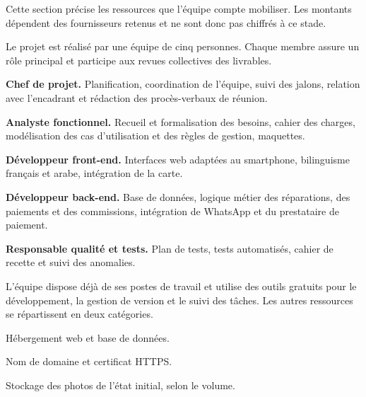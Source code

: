 

Cette section précise les ressources que l’équipe compte mobiliser. Les montants dépendent des fournisseurs retenus et ne sont donc pas chiffrés à ce stade.


Le projet est réalisé par une équipe de cinq personnes. Chaque membre assure un rôle principal et participe aux revues collectives des livrables.

\begin{cdcitems}
  \item \textbf{Chef de projet.} Planification, coordination de l’équipe, suivi des jalons, relation avec l’encadrant et rédaction des procès-verbaux de réunion.
  \item \textbf{Analyste fonctionnel.} Recueil et formalisation des besoins, cahier des charges, modélisation des cas d’utilisation et des règles de gestion, maquettes.
  \item \textbf{Développeur front-end.} Interfaces web adaptées au smartphone, bilinguisme français et arabe, intégration de la carte.
  \item \textbf{Développeur back-end.} Base de données, logique métier des réparations, des paiements et des commissions, intégration de WhatsApp et du prestataire de paiement.
  \item \textbf{Responsable qualité et tests.} Plan de tests, tests automatisés, cahier de recette et suivi des anomalies.
\end{cdcitems}


L’équipe dispose déjà de ses postes de travail et utilise des outils gratuits pour le développement, la gestion de version et le suivi des tâches. Les autres ressources se répartissent en deux catégories.


\begin{cdcitems}
  \item Hébergement web et base de données.
  \item Nom de domaine et certificat HTTPS.
  \item Stockage des photos de l’état initial, selon le volume.
\end{cdcitems}


